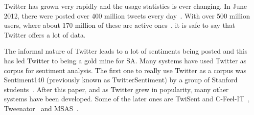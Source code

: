 Twitter has grown very rapidly and the usage statistics is ever changing. In June 2012, there were posted over 400 million tweets every day~\citep{site:twitterusage}. With over 500 million users, where about 170 million of these are active ones~\citep{site:users}, it is safe to say that Twitter offers a lot of data.


The informal nature of Twitter leads to a lot of sentiments being posted and this has led Twitter to being a gold mine for SA. Many systems have used Twitter as corpus for sentiment analysis. The first one to really use Twitter as a corpus was Sentiment140 (previously known as TwitterSentiment) by a group of Stanford students~\citep{article:go}. After this paper, and as Twitter grew in popularity, many other systems have been developed. Some of the later ones are TwiSent and C-Feel-IT~\citep{mukherjee2012twisent}, Tweenator~\citep{saif2012semantic} and MSAS~\citep{chamlertwat2012discovering}.
